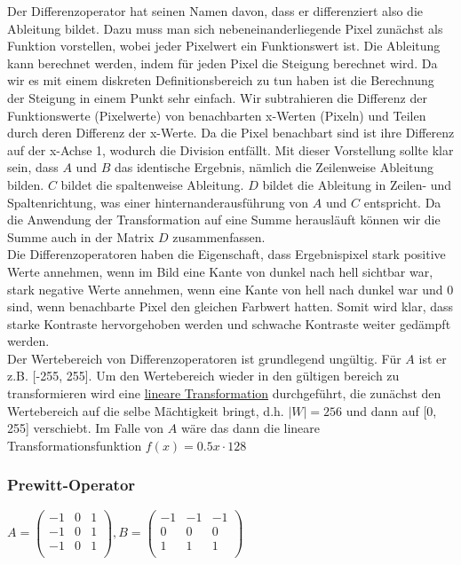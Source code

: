 \vspace{5px}

Der Differenzoperator hat seinen Namen davon, dass er differenziert also die Ableitung bildet. Dazu muss man sich nebeneinanderliegende Pixel zunächst als Funktion vorstellen, wobei jeder Pixelwert ein Funktionswert ist. Die Ableitung kann berechnet werden, indem für jeden Pixel die Steigung berechnet wird. Da wir es mit einem diskreten Definitionsbereich zu tun haben ist die Berechnung der Steigung in einem Punkt sehr einfach. Wir subtrahieren die Differenz der Funktionswerte (Pixelwerte) von benachbarten x-Werten (Pixeln) und Teilen durch deren Differenz der x-Werte. Da die Pixel benachbart sind ist ihre Differenz auf der x-Achse 1, wodurch die Division entfällt. Mit dieser Vorstellung sollte klar sein, dass $A$ und $B$ das identische Ergebnis, nämlich die Zeilenweise Ableitung bilden. $C$ bildet die spaltenweise Ableitung. $D$ bildet die Ableitung in Zeilen- und Spaltenrichtung, was einer hinternanderausführung von $A$ und $C$ entspricht. Da die Anwendung der Transformation auf eine Summe herausläuft können wir die Summe auch in der Matrix $D$ zusammenfassen.\\

Die Differenzoperatoren haben die Eigenschaft, dass Ergebnispixel stark positive Werte annehmen, wenn im Bild eine Kante von dunkel nach hell sichtbar war, stark negative Werte annehmen, wenn eine Kante von hell nach dunkel war und 0 sind, wenn benachbarte Pixel den gleichen Farbwert hatten. Somit wird klar, dass starke Kontraste hervorgehoben werden und schwache Kontraste weiter gedämpft werden.\\

Der Wertebereich von Differenzoperatoren ist grundlegend ungültig. Für $A$ ist er z.B. [-255, 255]. Um den Wertebereich wieder in den gültigen bereich zu transformieren wird eine \hyperref[sec:Punktoperationen]{lineare Transformation} durchgeführt, die zunächst den Wertebereich auf die selbe Mächtigkeit bringt, d.h. $|W|=256$ und dann auf [0, 255] verschiebt. Im Falle von $A$ wäre das dann die lineare Transformationsfunktion $f(x)=0.5x \cdot 128$

\subsubsection{Prewitt-Operator}

$
    A
    =
    \begin{pmatrix}
        -1 & 0 & 1 \\
        -1 & 0 & 1 \\
        -1 & 0 & 1 \\
    \end{pmatrix}
    ,
    B
    =
    \begin{pmatrix}
        -1 & -1 & -1 \\
        0  & 0  & 0  \\
        1  & 1  & 1  \\
    \end{pmatrix}
$

